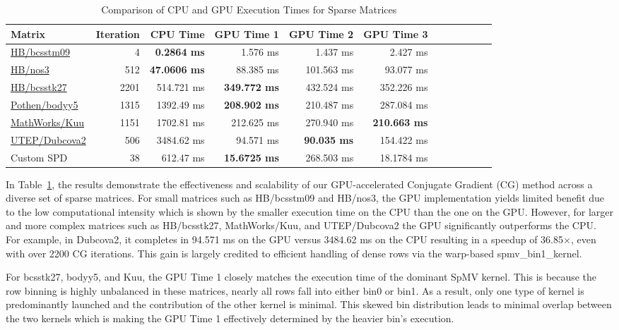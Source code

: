 \documentclass[conference]{IEEEtran}
\begin{document}
\begin{table}[htbp]
\centering
\tiny
\caption{Comparison of CPU and GPU Execution Times for Sparse Matrices}
\begin{tabular}{lrrrrrrrrrrr}
\hline
Matrix & Iteration & CPU Time & GPU Time 1 & GPU Time 2 & GPU Time 3  \\
\hline
\href{https://sparse.tamu.edu/HB/bcsstm09}{HB/bcsstm09}      & 4    & \textbf{0.2864 ms}   & 1.576 ms   & 1.437 ms   & 2.427 ms \\
\href{https://sparse.tamu.edu/HB/nos3}{HB/nos3}        		   & 512  & \textbf{47.0606 ms}  & 88.385 ms  & 101.563 ms & 93.077 ms \\
\href{https://sparse.tamu.edu/HB/bcsstk27}{HB/bcsstk27}       & 2201 & 514.721 ms  & \textbf{349.772 ms} & 432.524 ms & 352.226 ms \\
\href{https://sparse.tamu.edu/Pothen/bodyy5}{Pothen/bodyy5}  & 1315 & 1392.49 ms  & \textbf{208.902 ms} & 210.487 ms & 287.084 ms \\
\href{https://sparse.tamu.edu/MathWorks/Kuu}{MathWorks/Kuu}  & 1151 & 1702.81 ms  & 212.625 ms & 270.940 ms & \textbf{210.663 ms} \\
\href{https://sparse.tamu.edu/UTEP/Dubcova2}{UTEP/Dubcova2}   & 506  & 3484.62 ms  & 94.571 ms  & \textbf{90.035 ms}  & 154.422 ms \\
Custom SPD  																& 38  & 612.47 ms  & \textbf{15.6725 ms} & 268.503 ms & 18.1784 ms  \\
\hline
\end{tabular}
\label{tableTime}
\end{table}

In Table~\ref{tableTime}, the results demonstrate the effectiveness and scalability of our GPU-accelerated Conjugate Gradient (CG) method across a diverse set of sparse matrices. For small matrices such as HB/bcsstm09 and HB/nos3, the GPU implementation yields limited benefit due to the low computational intensity which is shown by the smaller execution time on the CPU than the one on the GPU. However, for larger and more complex matrices such as HB/bcsstk27, MathWorks/Kuu, and UTEP/Dubcova2 the GPU significantly outperforms the CPU. For example, in Dubcova2, it completes in 94.571 ms on the GPU versus 3484.62 ms on the CPU resulting in a speedup of 36.85$\times$, even with over 2200 CG iterations. This gain is largely credited to efficient handling of dense rows via the warp-based spmv\_bin1\_kernel.

For bcsstk27, bodyy5, and Kuu, the GPU Time 1 closely matches the execution time of the dominant SpMV kernel. This is because the row binning is highly unbalanced in these matrices, nearly all rows fall into either bin0 or bin1. As a result, only one type of kernel is predominantly launched and the contribution of the other kernel is minimal. This skewed bin distribution leads to minimal overlap between the two kernels which is making the GPU Time 1 effectively determined by the heavier bin's execution.
\end{document}
